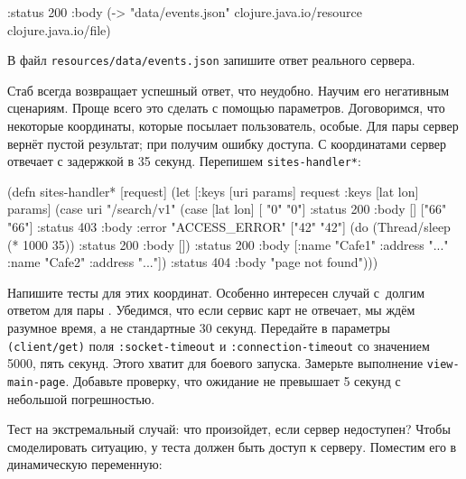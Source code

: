 
\begin{english}
  \begin{clojure}
{:status 200
 :body (-> "data/events.json"
           clojure.java.io/resource
           clojure.java.io/file)}
  \end{clojure}
\end{english}

\noindent
В файл \verb|resources/data/events.json| запишите ответ реального сервера.


Стаб всегда возвращает успешный ответ, что неудобно. Научим его негативным
сценариям. Проще всего это сделать с помощью параметров. Договоримся, что
некоторые координаты, которые посылает пользователь, особые. Для пары  сервер вернёт пустой результат; при  получим ошибку
доступа. С координатами  сервер отвечает с задержкой в 35
секунд. Перепишем \verb|sites-handler*|:

\begin{english}
  \begin{clojure}
(defn sites-handler* [request]
  (let [{:keys [uri params]} request
        {:keys [lat lon]} params]
    (case uri
      "/search/v1"
      (case [lat lon]
        [ "0"  "0"] {:status 200 :body []}
        ["66" "66"] {:status 403 :body {:error "ACCESS_ERROR"}}
        ["42" "42"] (do (Thread/sleep (* 1000 35))
                        {:status 200 :body []})
        {:status 200
         :body [{:name "Cafe1" :address "..."}
                {:name "Cafe2" :address "..."}]})
      {:status 404 :body "page not found"})))
  \end{clojure}
\end{english}


Напишите тесты для этих координат. Особенно интересен случай с~долгим ответом
для пары . Убедимся, что если сервис карт не отвечает, мы ждём
разумное время, а не стандартные 30 секунд. Передайте в параметры
\verb|(client/get)| поля \verb|:socket-timeout| и \verb|:connection-timeout| со
значением 5000, пять секунд. Этого хватит для боевого запуска. Замерьте
выполнение \verb|view-main-page|. Добавьте проверку, что ожидание не превышает 5
секунд с небольшой погрешностью.

Тест на экстремальный случай: что произойдет, если сервер недоступен? Чтобы
смоделировать ситуацию, у теста должен быть доступ к серверу. Поместим его в
динамическую переменную:


